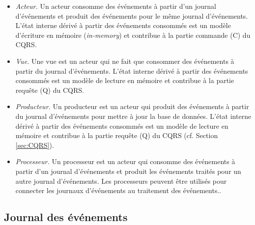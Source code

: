 \begin{itemize}
	\item \textit{Acteur.} Un acteur consomme des événements à partir d'un journal 
	d'événements et produit des événements pour le même journal d'événements. 
	L'état interne dérivé à partir des événements consommés est un modèle 
	d'écriture 
	en mémoire (\textit{in-memory}) et contribue à la partie commande (C) du 
	\gls{CQRS}.
	\item \textit{Vue.} Une vue est un acteur qui ne fait que consommer des 
	événements à 
	partir du journal d'événements. L'état interne dérivé à partir des événements 
	consommés est un modèle de lecture en mémoire et contribue à la partie 
	requête (Q) du \gls{CQRS}.
	\item \textit{Producteur.} Un producteur est un acteur qui produit des 
	événements à partir du journal d'événements pour mettre à jour la base 
	de données. L'état interne dérivé à partir des événements consommés est 
	un modèle de lecture en mémoire et 
	contribue à la partie requête (Q) du CQRS (cf. Section \ref{sec:CQRS}).
	\item \textit{Processeur.} Un processeur est un acteur qui consomme des 
	événements à partir d'un journal d'événements et produit les événements 
	traités pour un autre journal d'événements. Les processeurs peuvent être 
	utilisés pour connecter les journaux d'événements au traitement des 
	événements..
\end{itemize}


\subsection{Journal des événements}

